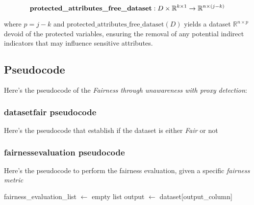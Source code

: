 \documentclass[12pt,a4paper,openright,twoside]{book}
\begin{document}
\[
\text{\textbf{protected\_attributes\_free\_dataset}}: D \times \mathbb{R}^{k \times 1} \rightarrow \mathbb{R}^{n \times (j - k)}
\]

where \( p = j - k \) and \( \text{protected\_attributes\_free\_dataset}(D) \) yields a dataset \( \mathbb{R}^{n \times p} \) devoid of the protected variables, ensuring the removal of any potential indirect indicators that may influence sensitive attributes.

\subsection{Pseudocode}
Here's the pseudocode of the \emph{Fairness through unawareness with proxy detection}:

\begin{algorithm}[H]
\end{algorithm}

\subsubsection{dataset\textunderscore fair pseudocode}
Here's the pseudocode that establish if the dataset is either \emph{Fair} or not

\begin{algorithm}[H]
\end{algorithm}

\subsubsection{fairness\textunderscore evaluation pseudocode}
Here's the pseudocode to perform the fairness evaluation, given a specific \emph{fairness metric}

\begin{algorithm}[H]
    fairness\_evaluation\_list $\gets$ empty list\;
    output $\gets$ dataset[output\_column]\;
\end{algorithm}
\end{document}
